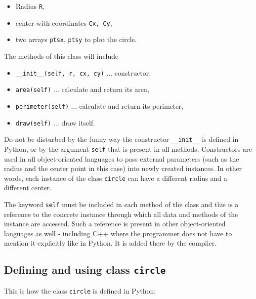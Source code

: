 \begin{itemize}
\item Radius {\tt R}, 
\item center with coordinates {\tt Cx, Cy}, 
\item two arrays {\tt ptsx}, {\tt ptsy} to plot the circle. 
\end{itemize}
The methods of this class will include 
\begin{itemize}
\item {\tt \_\_init\_\_(self, r, cx, cy)} ... constructor,
\item {\tt area(self)} ... calculate and return its area,
\item {\tt perimeter(self)} ... calculate and return its perimeter,
\item {\tt draw(self)} ... draw itself.
\end{itemize}
Do not be disturbed by the funny way the constructor {\tt \_\_init\_\_} 
is defined in Python, or by the argument {\tt self} that is present 
in all methods. Constructors are 
used in all object-oriented languages to pass external parameters 
(such as the radius and the center point in this case) into newly 
created instances. In other words, each instance of the class {\tt circle} 
can have a different radius and a different center.

The keyword {\tt self} must be included in each method of the class 
and this is a reference to the concrete instance through which all
data and methods of the instance are accessed. Such a reference is present 
in other object-oriented languages as well - including C++ where the programmer
does not have to mention it explicitly like in Python. It is added there by 
the compiler.

\subsection{Defining and using class {\tt circle}} \label{subsec:circle}

This is how the class {\tt circle} is defined in Python:

